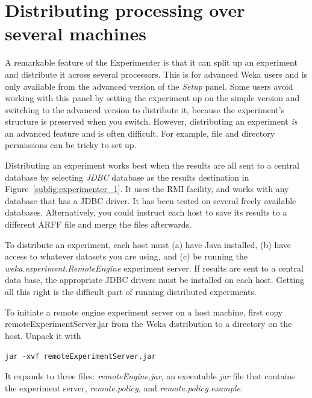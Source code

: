 \section{Distributing processing over several machines}
\label{section:experimenter_distributed}

A remarkable feature of the Experimenter is that it can split up an
experiment and distribute it across several processors. This is for
advanced Weka users and is only available from the advanced version of
the \textit{Setup} panel. Some users avoid working with this panel by
setting the experiment up on the simple version and switching to the
advanced version to distribute it, because the experiment's structure
is preserved when you switch. However, distributing an experiment
\textit{is} an advanced feature and is often difficult. For example,
file and directory permissions can be tricky to set up.

Distributing an experiment works best when the results are all sent to
a central database by selecting \textit{JDBC} database as the results
destination in Figure~\ref{subfig:experimenter_1}. It uses the RMI
facility, and works with any database that has a JDBC driver. It has
been tested on several freely available databases. Alternatively, you
could instruct each host to save its results to a different ARFF file
and merge the files afterwards.

To distribute an experiment, each host must (a) have Java installed,
(b) have access to whatever datasets you are using, and (c) be running
the \textit{weka.experiment.RemoteEngine} experiment server. If
results are sent to a central data base, the appropriate JDBC drivers
must be installed on each host. Getting all this right is the
difficult part of running distributed experiments.

To initiate a remote engine experiment server on a host machine, first
copy remoteExperimentServer.jar from the Weka distribution to a
directory on the host. Unpack it with\newline

\verb=jar -xvf remoteExperimentServer.jar=\newline

It expands to three files: \textit{remoteEngine.jar}, an executable
\textit{jar} file that contains the experiment server,
\textit{remote.policy}, and \textit{remote.policy.example}.

